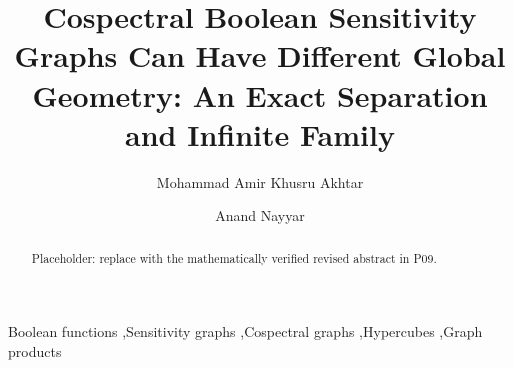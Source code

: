 \documentclass[preprint,12pt]{elsarticle}
\begin{document}
\begin{frontmatter}
\title{Cospectral Boolean Sensitivity Graphs Can Have Different Global Geometry: An Exact Separation and Infinite Family}
\author[umu]{Mohammad Amir Khusru Akhtar}
\author[dtu]{Anand Nayyar}
\address[umu]{Faculty of Computing and Information Technology, Usha Martin University, Ranchi, Jharkhand, India}
\address[dtu]{School of Computer Science and Artificial Intelligence, Duy Tan University, Da Nang, Viet Nam}
\begin{abstract}
Placeholder: replace with the mathematically verified revised abstract in P09.
\end{abstract}
\begin{keyword}
Boolean functions \sep Sensitivity graphs \sep Cospectral graphs \sep Hypercubes \sep Graph products
\end{keyword}
\end{frontmatter}
\end{document}
